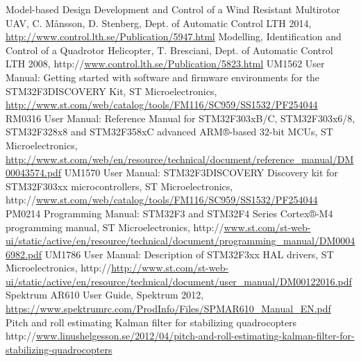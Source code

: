 \documentclass[a4paper]{report}
\begin{document}
\begin{thebibliography}{99}
 Model-based Design Development and Control of a Wind Resistant Multirotor UAV, C. Månsson, D. Stenberg, Dept. of Automatic Control LTH 2014, \url{http://www.control.lth.se/Publication/5947.html}
 Modelling, Identification and Control of a Quadrotor Helicopter, T. Bresciani, Dept. of Automatic Control LTH 2008, http://\url{www.control.lth.se/Publication/5823.html}
 UM1562 User Manual: Getting started with software and firmware environments for the STM32F3DISCOVERY Kit, ST Microelectronics, \url{http://www.st.com/web/catalog/tools/FM116/SC959/SS1532/PF254044}
 RM0316 User Manual: Reference Manual for  STM32F303xB/C, STM32F303x6/8, STM32F328x8 and STM32F358xC advanced ARM®-based 32-bit MCUs, ST Microelectronics, \url{http://www.st.com/web/en/resource/technical/document/reference_manual/DM00043574.pdf}
UM1570 User Manual: STM32F3DISCOVERY Discovery kit for STM32F303xx microcontrollers, ST Microelectronics, http://\url{www.st.com/web/catalog/tools/FM116/SC959/SS1532/PF254044}
PM0214 Programming Manual: STM32F3 and STM32F4 Series Cortex®-M4 programming manual, ST Microelectronics, http://\url{www.st.com/st-web-ui/static/active/en/resource/technical/document/programming_manual/DM00046982.pdf}
UM1786 User Manual: Description of STM32F3xx HAL drivers, ST Microelectronics, http://\url{http://www.st.com/st-web-ui/static/active/en/resource/technical/document/user_manual/DM00122016.pdf}
Spektrum AR610 User Guide, Spektrum 2012, \url{https://www.spektrumrc.com/ProdInfo/Files/SPMAR610_Manual_EN.pdf}
 Pitch and roll estimating Kalman filter for stabilizing quadrocopters http://{\url{www.linushelgesson.se/2012/04/pitch-and-roll-estimating-kalman-filter-for-stabilizing-quadrocopters}}
\end{thebibliography}
\end{document}
